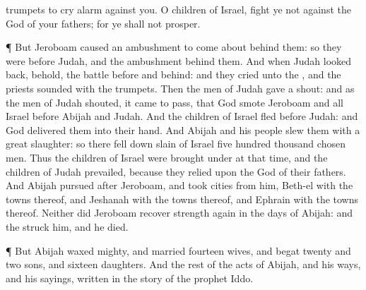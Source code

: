 {trumpets to cry
alarm against you. O
children of
Israel,
fight ye not against the
{}
God of your
fathers; for ye shall not
prosper.
\par }{\PP {}¶ But
Jeroboam caused an
ambushment to
come
about
behind them: so they were
before
Judah, and the
ambushment
{}
behind them.
And when
Judah looked
back, behold, the
battle
{}
before and
behind: and they
cried unto the
{}, and the
priests
sounded with the
trumpets.
Then the
men of
Judah gave a
shout: and as the
men of
Judah
shouted, it came to pass, that
God
smote
Jeroboam and all
Israel
before
Abijah and
Judah.
And the
children of
Israel
fled
before
Judah: and
God
delivered them into their
hand.
And
Abijah and his
people
slew them with a
great
slaughter: so there fell
down
slain of
Israel
five
hundred
thousand
chosen
men.
Thus the
children of
Israel were
brought under at that
time, and the
children of
Judah
prevailed, because they
relied upon the
{}
God of their
fathers.
And
Abijah
pursued
after
Jeroboam, and
took
cities from him,
Beth-el with the
towns thereof, and
Jeshanah with the
towns thereof, and
Ephrain with the
towns thereof.
Neither did
Jeroboam
recover
strength again in the
days of
Abijah: and the
{}
struck him, and he
died.
\par }{\PP {}¶ But
Abijah waxed
mighty, and
married
fourteen
wives, and
begat
twenty and
two
sons, and
sixteen
daughters.
And the
rest of the
acts of
Abijah, and his
ways, and his
sayings,
{}
written in the
story of the
prophet
Iddo.

}

